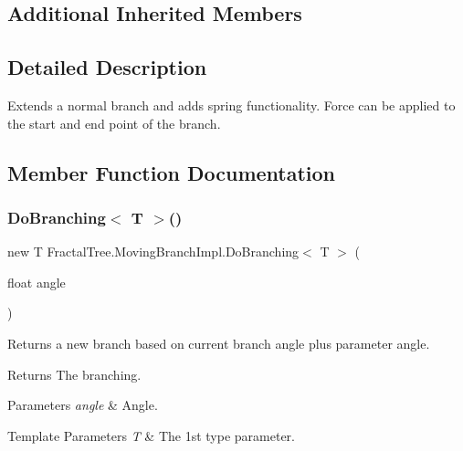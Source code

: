 \subsection*{Additional Inherited Members}


\subsection{Detailed Description}
Extends a normal branch and adds spring functionality. Force can be applied to the start and end point of the branch. 



\subsection{Member Function Documentation}
\hypertarget{class_fractal_tree_1_1_moving_branch_impl_a7f7776446fa70aac8efb669f9e41a4af}{}\label{class_fractal_tree_1_1_moving_branch_impl_a7f7776446fa70aac8efb669f9e41a4af} 
\subsubsection{\texorpdfstring{Do\+Branching$<$ T $>$()}{DoBranching< T >()}}
{\footnotesize\ttfamily new T Fractal\+Tree.\+Moving\+Branch\+Impl.\+Do\+Branching$<$ T $>$ (\begin{DoxyParamCaption}\item[{float}]{angle }\end{DoxyParamCaption})}



Returns a new branch based on current branch angle plus parameter angle. 

\begin{DoxyReturn}{Returns}
The branching.
\end{DoxyReturn}

\begin{DoxyParams}{Parameters}
{\em angle} & Angle.\\
\hline
\end{DoxyParams}

\begin{DoxyTemplParams}{Template Parameters}
{\em T} & The 1st type parameter.\\
\hline
\end{DoxyTemplParams}


